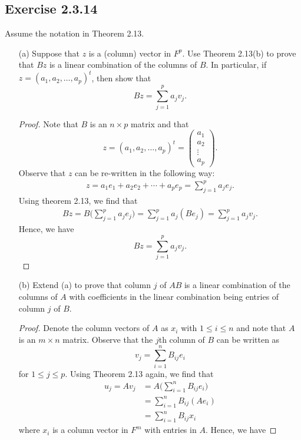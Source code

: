 \subsection*{Exercise 2.3.14}\label{Exercise 2.3.14} Assume the notation in Theorem 2.13.
\begin{enumerate}
    \item[(a)] Suppose that \( z  \) is a (column) vector in \( F^{p} \). Use Theorem 2.13(b) to prove that \( Bz  \) is a linear combination of the columns of \( B  \). In particular, if \( z = ({a}_{1}, {a}_{2}, \dots, {a}_{p})^{t} \), then show that  
        \[  Bz = \sum_{ j=1  }^{ p  } {a}_{j} {v}_{j}. \]
        \begin{proof}
        Note that \( B  \) is an \( n \times  p  \) matrix and that 
        \[  z = ({a}_{1}, {a}_{2}, \dots, {a}_{p})^{t} = \begin{pmatrix}
            {a}_{1} \\
            {a}_{2} \\
            \vdots \\
            {a}_{p}
        \end{pmatrix}. \]
        Observe that \( z  \) can be re-written in the following way:
        \begin{align*}
            z = {a}_{1} {e}_{1} + {a}_{2} {e}_{2} + \cdots + {a}_{p} {e}_{p}  
              = \sum_{ j=1  }^{ p  } {a}_{j } {e}_{j }.
        \end{align*}
        Using theorem 2.13, we find that
        \begin{align*}
            Bz = B \Big( \sum_{ j=1  }^{ p } {a}_{j} {e}_{j} \Big)
               = \sum_{ j=1  }^{ p } {a}_{j} (B {e}_{j}) 
               =  \sum_{ j=1  }^{ p } {a}_{j} {v}_{j}.
        \end{align*}
        Hence, we have
        \[  Bz = \sum_{ j=1  }^{ p } {a}_{j} {v}_{j}. \]


        \end{proof}
    \item[(b)] Extend (a) to prove that column \( j  \) of \( AB  \) is a linear combination of the columns of \( A  \) with coefficients in the linear combination being entries of column \( j  \) of \(  B \). 
        \begin{proof}
        Denote the column vectors of \( A  \) as \( {x}_{i} \) with \( 1 \leq i \leq n  \) and note that \( A  \) is an \( m \times n  \) matrix. Observe that the \( j \)th column of \( B  \) can be written as
        \[  {v}_{j} = \sum_{ i=1  }^{ n } {B}_{ij} {e}_{i} \]
        for \( 1 \leq j \leq p  \). Using Theorem 2.13 again, we find that
        \begin{align*}
            {u}_{j}  = A {v}_{j}  &= A \Big( \sum_{ i=1  }^{ n } {B}_{ij} {e}_{i} \Big) \\
                                  &= \sum_{ i=1  }^{ n } {B}_{ij} ({Ae}_{i}) \\
                                  &= \sum_{ i=1  }^{ n } {B}_{ij} {x}_{i}
        \end{align*}
        where \( {x}_{i}  \) is a column vector in \( F^{m} \) with entries in \(  A  \). Hence, we have


\end{proof}
\end{enumerate}
